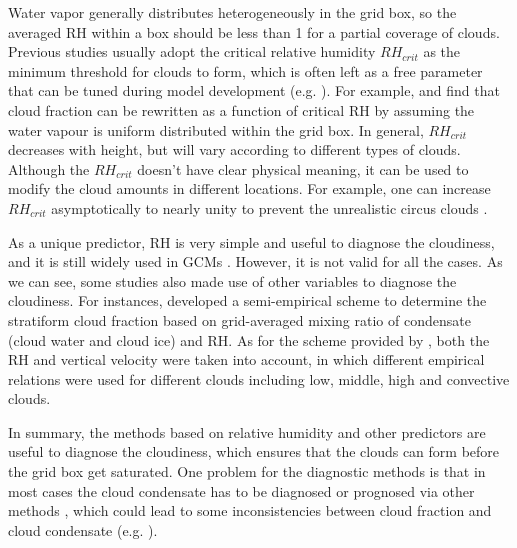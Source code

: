 Water vapor generally distributes heterogeneously in the grid box, so the averaged RH within a box should be less than 1 for a partial coverage of clouds. Previous studies usually adopt the critical relative humidity $RH_{crit}$ as the minimum threshold for clouds to form, which is often left as a free parameter that can be tuned during model development (e.g. \citealp{Hourdin2017,Kay2012,Mauritsen2012}). For example, \cite{Sundqvist1978} and \cite{Sundqvist1989} find that cloud fraction can be rewritten as a function of critical RH by assuming the water vapour is uniform distributed within the grid box. In general, $RH_{crit}$ decreases with height, but will vary according to different types of clouds. Although the $RH_{crit}$ doesn't have clear physical meaning, it can be used to modify the cloud amounts in different locations. For example, one can increase $RH_{crit}$ asymptotically to nearly unity to prevent the unrealistic circus clouds \citep{Sundqvist1989}. 

As a unique predictor, RH is very simple and useful to diagnose the cloudiness, and it is still widely used in GCMs \citep[e.g.,][]{Gordon1992,Park2014,Pope2000}. However, it is not valid for all the cases. As we can see, some studies also made use of other variables to diagnose the cloudiness. For instances, \cite{Xu1996} developed a semi-empirical scheme to determine the stratiform cloud fraction based on grid-averaged mixing ratio of condensate (cloud water and cloud ice) and RH. As for the scheme provided by \cite{Slingo1987}, both the RH and vertical velocity were taken into account, in which different empirical relations were used for different clouds including low, middle, high and convective clouds.

In summary, the methods based on relative humidity and other predictors are useful to diagnose the cloudiness, which ensures that the clouds can form before the grid box get saturated. One problem for the diagnostic methods is that in most cases the cloud condensate has to be diagnosed or prognosed via other methods \citep[e.g.,][]{Zhang2003, Park2014}, which could lead to some inconsistencies between cloud fraction and cloud condensate (e.g. \citealp{Gregory2002, Tompkins2005}).



